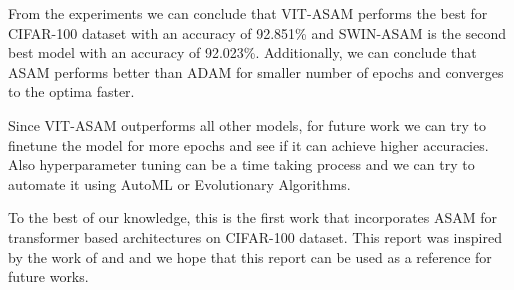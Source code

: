 \documentclass{article}
\begin{document}
From the experiments we can conclude that VIT-ASAM performs the best for CIFAR-100 dataset with an accuracy of 92.851\% and SWIN-ASAM is the second best model with an accuracy of 92.023\%.
Additionally, we can conclude that ASAM performs better than ADAM for smaller number of epochs and converges to the optima faster.

Since VIT-ASAM outperforms all other models, for future work we can try to finetune the model for more epochs and see if it can achieve higher accuracies.
Also hyperparameter tuning can be a time taking process and we can try to automate it using AutoML or Evolutionary Algorithms.

To the best of our knowledge, this is the first work that incorporates ASAM for transformer based architectures on CIFAR-100 dataset.
This report was inspired by the work of \cite{DBLP:journals/corr/abs-2102-11600} and \cite{DBLP:journals/corr/abs-2103-14030} and we hope that this report can be used as a reference for future works.


\nocite{*}




\end{document}
